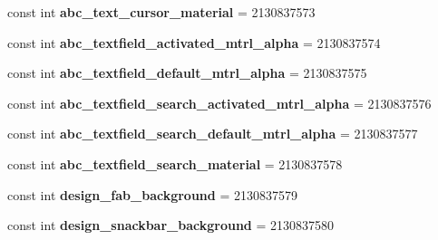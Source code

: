 \begin{DoxyCompactItemize}
const int {\bfseries abc\+\_\+text\+\_\+cursor\+\_\+material} = 2130837573
\item 
\mbox{\label{class_sample_app_1_1_droid_1_1_resource_1_1_drawable_aeda02bfd7a98ae0c272dc33795ae2665}} 
const int {\bfseries abc\+\_\+textfield\+\_\+activated\+\_\+mtrl\+\_\+alpha} = 2130837574
\item 
\mbox{\label{class_sample_app_1_1_droid_1_1_resource_1_1_drawable_a08fc61850348cf5255f99cf6d07f22ee}} 
const int {\bfseries abc\+\_\+textfield\+\_\+default\+\_\+mtrl\+\_\+alpha} = 2130837575
\item 
\mbox{\label{class_sample_app_1_1_droid_1_1_resource_1_1_drawable_ab4d46fe901f38263e087223a7cb4f431}} 
const int {\bfseries abc\+\_\+textfield\+\_\+search\+\_\+activated\+\_\+mtrl\+\_\+alpha} = 2130837576
\item 
\mbox{\label{class_sample_app_1_1_droid_1_1_resource_1_1_drawable_a988446ec8e3f41ca1386780c468dd475}} 
const int {\bfseries abc\+\_\+textfield\+\_\+search\+\_\+default\+\_\+mtrl\+\_\+alpha} = 2130837577
\item 
\mbox{\label{class_sample_app_1_1_droid_1_1_resource_1_1_drawable_a07198c368f56ab9d3385640f412da7fd}} 
const int {\bfseries abc\+\_\+textfield\+\_\+search\+\_\+material} = 2130837578
\item 
\mbox{\label{class_sample_app_1_1_droid_1_1_resource_1_1_drawable_ae2dfc3272a1eb9bc03fd0cf36f55a253}} 
const int {\bfseries design\+\_\+fab\+\_\+background} = 2130837579
\item 
\mbox{\label{class_sample_app_1_1_droid_1_1_resource_1_1_drawable_acbffc7cdc42efe8dc8fd28c9974082f9}} 
const int {\bfseries design\+\_\+snackbar\+\_\+background} = 2130837580
\item 
\mbox{\label{class_sample_app_1_1_droid_1_1_resource_1_1_drawable_a689a3cb05d09fe20b4cbf07a18131601}} 

\end{DoxyCompactItemize}
